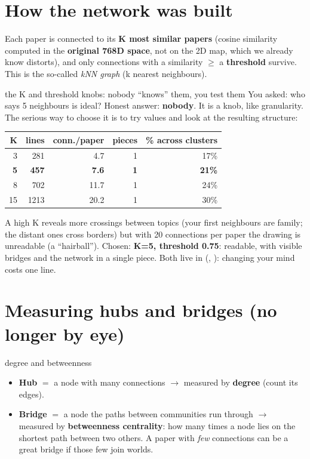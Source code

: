\documentclass[11pt,a4paper]{article}
\begin{document}

\section{How the network was built}

Each paper is connected to its \textbf{K most similar papers} (cosine similarity computed in
the \textbf{original 768D space}, not on the 2D map, which we already know distorts), and only
connections with a similarity $\geq$ a \textbf{threshold} survive. This is the so-called
\emph{kNN graph} (k nearest neighbours).

\begin{concepto}{the K and threshold knobs: nobody ``knows'' them, you test them}
You asked: who says 5 neighbours is ideal? Honest answer: \textbf{nobody}. It is a knob, like
granularity. The serious way to choose it is to try values and look at the resulting
structure:

\begin{center}
\begin{tabular}{rrrrr}
\textbf{K} & \textbf{lines} & \textbf{conn./paper} & \textbf{pieces} & \textbf{\% across clusters} \\
\hline
3 & 281 & 4.7 & 1 & 17\% \\
\textbf{5} & \textbf{457} & \textbf{7.6} & \textbf{1} & \textbf{21\%} \\
8 & 702 & 11.7 & 1 & 24\% \\
15 & 1213 & 20.2 & 1 & 30\% \\
\end{tabular}
\end{center}

A high K reveals more crossings between topics (your first neighbours are family; the distant
ones cross borders) but with 20 connections per paper the drawing is unreadable (a
``hairball''). Chosen: \textbf{K=5, threshold 0.75}: readable, with visible bridges and the
network in a single piece. Both live in  (,
): changing your mind costs one line.
\end{concepto}

\section{Measuring hubs and bridges (no longer by eye)}

\begin{concepto}{degree and betweenness}
\begin{itemize}
  \item \textbf{Hub} $=$ a node with many connections $\rightarrow$ measured by
        \textbf{degree} (count its edges).
  \item \textbf{Bridge} $=$ a node the paths between communities run through $\rightarrow$
        measured by \textbf{betweenness centrality}: how many times a node lies on the
        shortest path between two others. A paper with \emph{few} connections can be a great
        bridge if those few join worlds.
\end{itemize}
\end{concepto}
\end{document}
